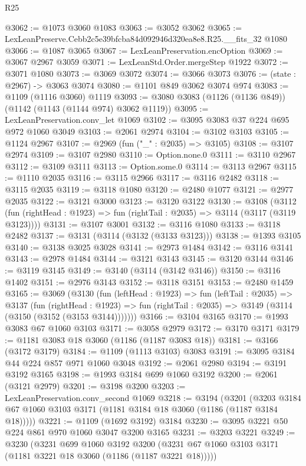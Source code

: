 \begin{lexlean}{R25}
\begin{coremodule}
@3062 := @1073 @3060 @1083
@3063 := @3052 @3062
@3065 := LexLeanPreserve.Cebb2c5e39bfcba84d092946d320ea8e8.R25.__fits_32 @1080
@3066 := @1087 @3065
@3067 := LexLeanPreservation.encOption
@3069 := @3067 @2967 @3059
@3071 := LexLeanStd.Order.mergeStep @1922
@3072 := @3071 @1080
@3073 := @3069 @3072
@3074 := @3066 @3073
@3076 := (state : @2967) -> @3063 @3074
@3080 := @1101 @849 @3062 @3074 @974
@3083 := @1109 (@1116 @3060) @1119
@3093 := @3080 @3083 (@1126 (@1136 @849)) (@1142 (@1143 (@1144 @974) @3062 @1119))
@3095 := LexLeanPreservation.conv_let @1069
@3102 := @3095 @3083 @37 @224 @695 @972 @1060 @3049
@3103 := @2061 @2974
@3104 := @3102 @3103
@3105 := @1124 @2967
@3107 := @2969 (fun ("_" : @2035) => @3105)
@3108 := @3107 @2974
@3109 := @3107 @2980
@3110 := Option.none.{0}
@3111 := @3110 @2967
@3112 := @3109 @3111
@3113 := Option.some.{0}
@3114 := @3113 @2967
@3115 := @1110 @2035
@3116 := @3115 @2966
@3117 := @3116 @2482
@3118 := @3115 @2035
@3119 := @3118 @1080
@3120 := @2480 @1077
@3121 := @2977 @2035
@3122 := @3121 @3000
@3123 := @3120 @3122
@3130 := @3108
    (@3112 (fun (rightHead : @1923) => fun (rightTail : @2035) => @3114 (@3117 (@3119 @3123))))
@3131 := @3107 @3001
@3132 := @3116 @1080
@3133 := @3118 @2482
@3137 := @3131 (@3114 (@3132 (@3133 @3123)))
@3138 := @1393 @3105
@3140 := @3138 @3025 @3028
@3141 := @2973 @1484
@3142 := @3116 @3141
@3143 := @2978 @1484
@3144 := @3121 @3143
@3145 := @3120 @3144
@3146 := @3119 @3145
@3149 := @3140 (@3114 (@3142 @3146))
@3150 := @3116 @1402
@3151 := @2976 @3143
@3152 := @3118 @3151
@3153 := @2480 @1459
@3165 := @3069
    (@3130
      (fun (leftHead : @1923) =>
      fun (leftTail : @2035) =>
      @3137
        (fun (rightHead : @1923) =>
        fun (rightTail : @2035) => @3149 (@3114 (@3150 (@3152 (@3153 @3144)))))))
@3166 := @3104 @3165
@3170 := @1993 @3083 @67 @1060 @3103
@3171 := @3058 @2979
@3172 := @3170 @3171
@3179 := @1181 @3083 @18 @3060 (@1186 (@1187 @3083 @18))
@3181 := @3166 (@3172 @3179)
@3184 := @1109 (@1113 @3103) @3083
@3191 := @3095 @3184 @44 @224 @857 @971 @1060 @3048
@3192 := @2061 @2980
@3194 := @3191 @3192 @3165
@3198 := @1993 @3184 @699 @1060 @3192
@3200 := @2061 (@3121 @2979)
@3201 := @3198 @3200
@3203 := LexLeanPreservation.conv_second @1069
@3218 := @3194
    (@3201 (@3203 @3184 @67 @1060 @3103 @3171 (@1181 @3184 @18 @3060 (@1186 (@1187 @3184 @18)))))
@3221 := @1109 (@1692 @3192) @3184
@3230 := @3095 @3221 @50 @224 @861 @970 @1060 @3047 @3200 @3165
@3231 := @3203 @3221
@3249 := @3230
    (@3231
      @699
      @1060
      @3192
      @3200
      (@3231 @67 @1060 @3103 @3171 (@1181 @3221 @18 @3060 (@1186 (@1187 @3221 @18)))))

\end{coremodule}
\end{lexlean}
